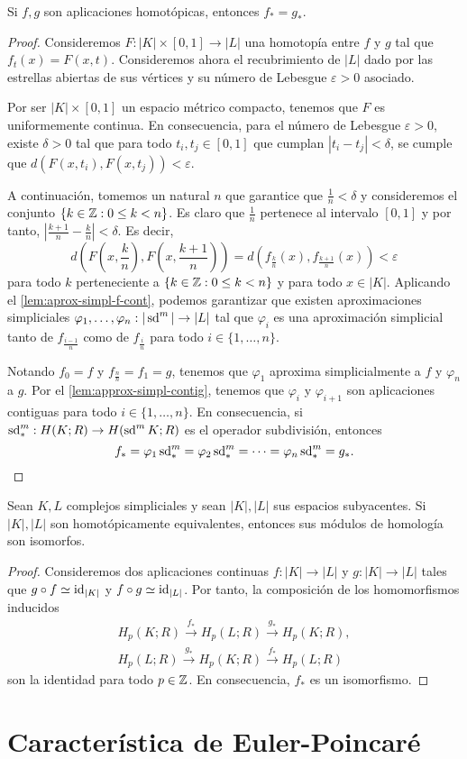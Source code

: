 \begin{teorema}
	Si $f,g$ son aplicaciones homotópicas, entonces $f_*=g_*$.
\end{teorema}
\begin{proof}
	Consideremos $F: |K| \times [0,1] \to |L|$ una homotopía entre $f$ y $g$ tal que $f_t(x) = F(x,t)$. Consideremos ahora el recubrimiento de $|L|$ dado por las estrellas abiertas de sus vértices y su número de Lebesgue $\varepsilon > 0$ asociado.

	Por ser $|K| \times [0,1]$ un espacio métrico compacto, tenemos que $F$ es uniformemente continua. En consecuencia, para el número de Lebesgue $\varepsilon > 0$, existe $\delta > 0$ tal que para todo $t_i, t_j \in [0,1]$ que cumplan $|t_i - t_j| < \delta$, se cumple que $d(F(x,t_i),F(x,t_j)) < \varepsilon$.

	A continuación, tomemos un natural $n$ que garantice que $\frac{1}{n} < \delta$ y consideremos el conjunto $\{ k \in \mathbb{Z} : 0 \leq k < n \}$. Es claro que $\frac{1}{n}$ pertenece al intervalo $[0,1]$ y por tanto, $|\frac{k+1}{n} - \frac{k}{n}| < \delta$. Es decir,
	\[
		d\left(F(x,\frac{k}{n}), F(x, \frac{k+1}{n})\right) = d\left(f_{\frac{k}{n}}(x), f_{\frac{k+1}{n}}(x)\right) < \varepsilon
	\]
	para todo $k$ perteneciente a $\{k \in \mathbb{Z} : 0 \leq k < n\}$ y para todo $x \in |K|$. Aplicando el \autoref{lem:aprox-simpl-f-cont}, podemos garantizar que existen aproximaciones simpliciales $\varphi_1, \dots, \varphi_n : |\operatorname{sd}^m| \to |L|$ tal que $\varphi_i$ es una aproximación simplicial tanto de $f_{\frac{i-1}{n}}$ como de $f_{\frac{i}{n}}$ para todo $i \in \{1, \dots, n\}$.

	Notando $f_0 = f$ y $f_{\frac{n}{n}} = f_1 = g$, tenemos que $\varphi_1$ aproxima simplicialmente a $f$ y $\varphi_{n}$ a $g$. Por el \autoref{lem:approx-simpl-contig}, tenemos que $\varphi_i$ y $\varphi_{i+1}$ son aplicaciones contiguas para todo $i \in \{1, \dots, n\}$. En consecuencia, si $\operatorname{sd}^m_* : H(K;R) \to H(\operatorname{sd}^m K;R)$ es el operador subdivisión, entonces
	\[
		f_* = \varphi_1 \operatorname{sd}^m_* = \varphi_2 \operatorname{sd}^m_* = \dots = \varphi_{n} \operatorname{sd}^m_* = g_*.
	\]
\end{proof}
\begin{corolario}
	Sean $K,L$ complejos simpliciales y sean $|K|,|L|$ sus espacios subyacentes. Si $|K|,|L|$ son homotópicamente equivalentes, entonces sus módulos de homología son isomorfos.
\end{corolario}
\begin{proof}
	Consideremos dos aplicaciones continuas $f: |K| \to |L|$ y $g: |K| \to |L|$ tales que $g \circ f \simeq \operatorname{id}_{|K|}$ y $f \circ g \simeq \operatorname{id}_{|L|}$. Por tanto, la composición de los homomorfismos inducidos
	\begin{gather*}
		H_p(K;R) \overset{f_*}{\to} H_p(L;R) \overset{g_*}{\to} H_p(K;R), \\
		H_p(L;R) \overset{g_*}{\to} H_p(K;R) \overset{f_*}{\to} H_p(L;R)
	\end{gather*}
	son la identidad para todo $p \in \mathbb{Z}$. En consecuencia, $f_*$ es un isomorfismo.
\end{proof}

\section{Característica de Euler-Poincaré}

\endinput
